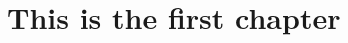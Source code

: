 \documentclass[../thesis.tex]{subfiles}
\begin{document}
\newpage
\chapter{This is the first chapter}



\end{document}
